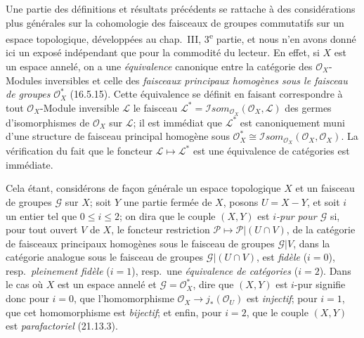 \begin{remark}[21.13.13]
\label{IV.21.13.13}
Une partie des définitions et résultats précédents se rattache à des considérations
plus générales sur la cohomologie des faisceaux de groupes commutatifs sur un espace
topologique, développées au chap.~III, 3\textsuperscript{e} partie, et nous n'en avons
donné ici un exposé indépendant que pour la commodité du lecteur. En effet, si $X$
est un espace annelé, on a une \emph{équivalence} canonique entre la catégorie des
$\mathcal O_X$-Modules inversibles et celle des \emph{faisceaux principaux homogènes
sous le faisceau de groupes} $\mathcal O_X^*$ (16.5.15). Cette équivalence se définit
en faisant correspondre à tout $\mathcal O_X$-Module inversible $\mathscr L$ le
faisceau $\mathscr L^*=\mathscr Isom_{\mathcal O_X}(\mathcal O_X,\mathscr L)$ des
germes d'isomorphismes de $\mathcal O_X$ sur $\mathscr L$; il est immédiat que
$\mathscr L^*$ est canoniquement muni d'une structure de faisceau principal homogène
sous $\mathcal O_X^*\cong\mathscr Isom_{\mathcal O_X}(\mathcal O_X,\mathcal O_X)$.
La vérification du fait que le foncteur $\mathscr L\mapsto\mathscr L^*$ est une
équivalence de catégories est immédiate.

Cela étant, considérons de façon générale un espace topologique $X$ et un faisceau de
groupes $\mathscr G$ sur $X$; soit $Y$ une partie fermée de $X$, posons $U=X-Y$, et
soit $i$ un entier tel que $0\leq i\leq2$; on dira que le couple $(X,Y)$ est
\emph{$i$-pur pour $\mathscr G$} si, pour tout ouvert $V$ de $X$, le foncteur
restriction $\mathscr P\mapsto\mathscr P|(U\cap V)$, de la catégorie de faisceaux
principaux homogènes sous le faisceau de groupes $\mathscr G|V$, dans la catégorie
analogue sous le faisceau de groupes $\mathscr G|(U\cap V)$, est \emph{fidèle}
($i=0$), resp.\ \emph{pleinement fidèle} ($i=1$), resp.\ une \emph{équivalence de
catégories} ($i=2$). Dans le cas où $X$ est un espace annelé et
$\mathscr G=\mathcal O_X^*$, dire que $(X,Y)$ est $i$-pur signifie donc pour $i=0$,
que l'homomorphisme $\mathcal O_X\to j_*(\mathcal O_U)$ est \emph{injectif}; pour
$i=1$, que cet homomorphisme est \emph{bijectif}; et enfin, pour $i=2$, que le couple
$(X,Y)$ est \emph{parafactoriel} (21.13.3).


\end{remark}
